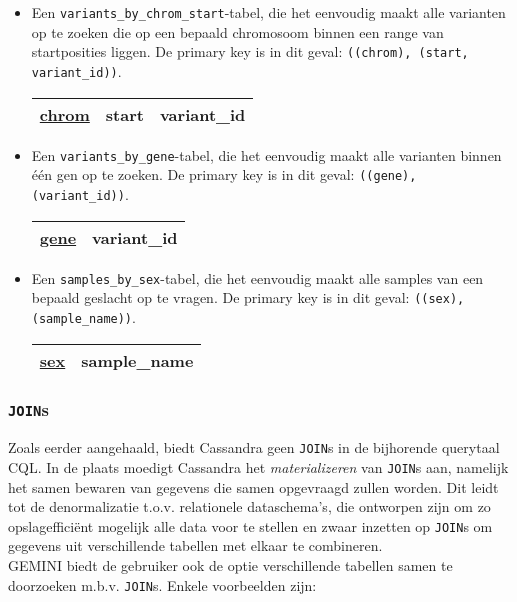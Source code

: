 \begin{itemize}
\item Een \texttt{variants\_by\_chrom\_start}-tabel, die het eenvoudig maakt alle varianten op te zoeken die op een bepaald chromosoom binnen een range van startposities liggen. De primary key is in dit geval: \texttt{((chrom), (start, variant\_id))}. 

\begin{table}[!htbp]
\begin{tabular}{@{}|l|l|l|@{}}
\toprule
\color{ForestGreen} \underline{chrom} & \color{red} start & \color{red} variant\_id \\ \bottomrule
\end{tabular}
\end{table}

\item Een \texttt{variants\_by\_gene}-tabel, die het eenvoudig maakt alle varianten binnen \'e\'en gen op te zoeken. De primary key is in dit geval: \texttt{((gene), (variant\_id))}.

\begin{table}[!htbp]
\begin{tabular}{@{}|l|l|@{}}
\toprule
\color{ForestGreen} \underline{gene} & \color{red} variant\_id \\ \bottomrule
\end{tabular}
\end{table}

\item Een \texttt{samples\_by\_sex}-tabel, die het eenvoudig maakt alle samples van een bepaald geslacht op te vragen. De primary key is in dit geval: \texttt{((sex), (sample\_name))}.

\begin{table}[!htbp]
\begin{tabular}{@{}|l|l|@{}}
\toprule
\color{ForestGreen} \underline{sex} & \color{red} sample\_name \\ \bottomrule
\end{tabular}
\end{table}
\end{itemize}

\subsubsection{\texttt{JOIN}s}

Zoals eerder aangehaald, biedt Cassandra geen \texttt{JOIN}s in de bijhorende querytaal CQL. In de plaats moedigt Cassandra het \textit{materializeren} van \texttt{JOIN}s aan, namelijk het samen bewaren van gegevens die samen opgevraagd zullen worden. Dit leidt tot de denormalizatie t.o.v. relationele dataschema's, die ontworpen zijn om zo opslageffici\"ent mogelijk alle data voor te stellen en zwaar inzetten op \texttt{JOIN}s om gegevens uit verschillende tabellen met elkaar te combineren.\\
GEMINI biedt de gebruiker ook de optie verschillende tabellen samen te doorzoeken m.b.v. \texttt{JOIN}s. Enkele voorbeelden zijn:

